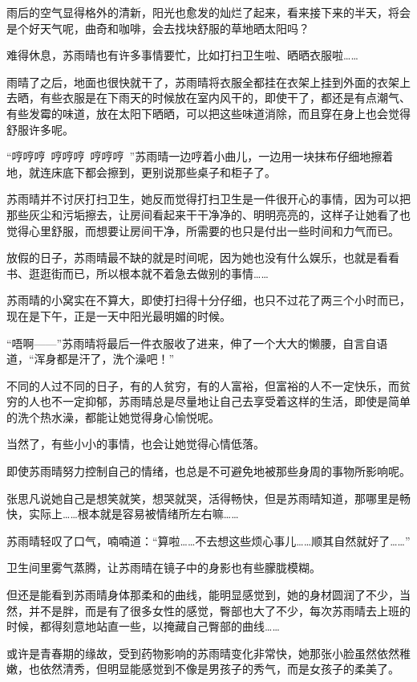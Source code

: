 雨后的空气显得格外的清新，阳光也愈发的灿烂了起来，看来接下来的半天，将会是个好天气呢，曲奇和咖啡，会去找块舒服的草地晒太阳吗？

难得休息，苏雨晴也有许多事情要忙，比如打扫卫生啦、晒晒衣服啦……

雨晴了之后，地面也很快就干了，苏雨晴将衣服全都挂在衣架上挂到外面的衣架上去晒，有些衣服是在下雨天的时候放在室内风干的，即使干了，都还是有点潮气、有些发霉的味道，放在太阳下晒晒，可以把这些味道消除，而且穿在身上也会觉得舒服许多呢。

“哼哼哼~哼哼哼~哼哼哼~”苏雨晴一边哼着小曲儿，一边用一块抹布仔细地擦着地，就连床底下都会擦到，更别说那些桌子和柜子了。

苏雨晴并不讨厌打扫卫生，她反而觉得打扫卫生是一件很开心的事情，因为可以把那些灰尘和污垢擦去，让房间看起来干干净净的、明明亮亮的，这样子让她看了也觉得心里舒服，而想要让房间干净，所需要的也只是付出一些时间和力气而已。

放假的日子，苏雨晴最不缺的就是时间呢，因为她也没有什么娱乐，也就是看看书、逛逛街而已，所以根本就不着急去做别的事情……

苏雨晴的小窝实在不算大，即使打扫得十分仔细，也只不过花了两三个小时而已，现在是下午，正是一天中阳光最明媚的时候。

“唔啊——”苏雨晴将最后一件衣服收了进来，伸了一个大大的懒腰，自言自语道，“浑身都是汗了，洗个澡吧！”

不同的人过不同的日子，有的人贫穷，有的人富裕，但富裕的人不一定快乐，而贫穷的人也不一定抑郁，苏雨晴总是尽量地让自己去享受着这样的生活，即使是简单的洗个热水澡，都能让她觉得身心愉悦呢。

当然了，有些小小的事情，也会让她觉得心情低落。

即使苏雨晴努力控制自己的情绪，也总是不可避免地被那些身周的事物所影响呢。

张思凡说她自己是想笑就笑，想哭就哭，活得畅快，但是苏雨晴知道，那哪里是畅快，实际上……根本就是容易被情绪所左右嘛……

苏雨晴轻叹了口气，喃喃道：“算啦……不去想这些烦心事儿……顺其自然就好了……”

卫生间里雾气蒸腾，让苏雨晴在镜子中的身影也有些朦胧模糊。

但还是能看到苏雨晴身体那柔和的曲线，能明显感觉到，她的身材圆润了不少，当然，并不是胖，而是有了很多女性的感觉，臀部也大了不少，每次苏雨晴去上班的时候，都得刻意地站直一些，以掩藏自己臀部的曲线……

或许是青春期的缘故，受到药物影响的苏雨晴变化非常快，她那张小脸虽然依然稚嫩，也依然清秀，但明显能感觉到不像是男孩子的秀气，而是女孩子的柔美了。

